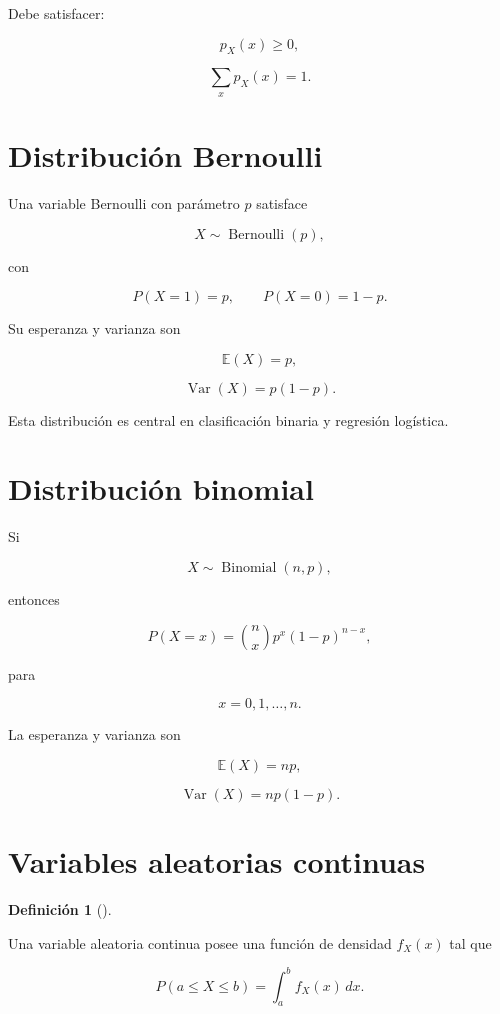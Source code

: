 \documentclass[
  spanish,
  11pt,
  letterpaper,
  DIV=11,
  numbers=noendperiod]{scrreprt}
\theoremstyle{definition}
\newtheorem{definition}{Definición}[chapter]
\theoremstyle{plain}
\theoremstyle{definition}
\theoremstyle{remark}
\begin{document}
Debe satisfacer:

\[
p_X(x)\geq 0,
\]

\[
\sum_x p_X(x)=1.
\]

\section{Distribución Bernoulli}\label{distribuciuxf3n-bernoulli}

Una variable Bernoulli con parámetro \(p\) satisface

\[
X\sim\operatorname{Bernoulli}(p),
\]

con

\[
P(X=1)=p,
\qquad
P(X=0)=1-p.
\]

Su esperanza y varianza son

\[
\mathbb{E}(X)=p,
\]

\[
\operatorname{Var}(X)=p(1-p).
\]

Esta distribución es central en clasificación binaria y regresión
logística.

\section{Distribución binomial}\label{distribuciuxf3n-binomial}

Si

\[
X\sim\operatorname{Binomial}(n,p),
\]

entonces

\[
P(X=x)
=
\binom{n}{x}
p^x(1-p)^{n-x},
\]

para

\[
x=0,1,\ldots,n.
\]

La esperanza y varianza son

\[
\mathbb{E}(X)=np,
\]

\[
\operatorname{Var}(X)=np(1-p).
\]

\section{Variables aleatorias
continuas}\label{variables-aleatorias-continuas}

\begin{definition}[]\protect\hypertarget{def-variable-continua}{}\label{def-variable-continua}

Una variable aleatoria continua posee una función de densidad \(f_X(x)\)
tal que

\[
P(a\leq X\leq b)
=
\int_a^b f_X(x)\,dx.
\]

\end{definition}
\end{document}
